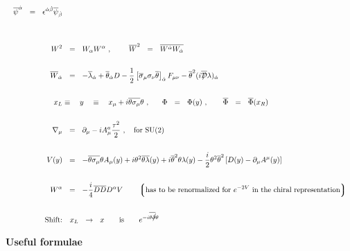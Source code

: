 \documentclass[14pt]{article}
\newcommand{\mc}[1]{\mathcal{#1}}
\newcommand{\ov}{\overline}
\newcommand{\lgr}{\left\lgroup}
\newcommand{\rgr}{\right\rgroup}
\def\slashed#1{\setbox0=\hbox{$#1$}             %
   \dimen0=\wd0                                 %
   \setbox1=\hbox{/} \dimen1=\wd1               %
   \ifdim\dimen0>\dimen1                        %
      \rlap{\hbox to \dimen0{\hfil/\hfil}}      %
      #1                                        %
   \else                                        %
      \rlap{\hbox to \dimen1{\hfil$#1$\hfil}}   %
      /                                         %
   \fi}                                         %
\begin{document}
\begin{align*}
\quad
	    \overline{\psi}^{\dot{\alpha}} ~~=~~ 
			  \epsilon^{\dot{\alpha}\dot{\beta}}
			  \overline{\psi}_{\dot{\beta}}\\ \\
 \\
  W^2 & ~~=~~  W_\alpha W^\alpha~,~~~~~~~ 
    \overline{W}^2 ~~=~~ \overline{W^{\dot{\alpha}} W_{\dot{\alpha}}} \\ \\
  \overline{W}_{\dot{\alpha}} & ~~=~~ 
        - \overline{\lambda}_{\dot{\alpha}} +
	  \overline{\theta}_{\dot{\alpha}} D -
	  \frac{1}{2} \left [ 
	      \overline{\sigma}_\mu\sigma_\nu \overline{\theta}
	              \right ]_{\dot{\alpha}} F_{\mu\nu} -
	  \overline{\theta}^2 (i \ov{\slashed{\mc{D}}}\lambda)_{\dot{\alpha}} \\ \\
  x_L & \equiv  ~~~y ~~~ 
	\equiv ~~~ x_\mu + i \overline{\theta\sigma_\mu}\theta~,~~~~~
   \Phi ~~=~~ \Phi(y)~,~~~~~~\overline{\Phi} ~~=~~ \overline{\Phi}(x_R) \\ \\
  \nabla_\mu & ~~=~~  \partial_\mu - i A_\mu^a \frac{\tau^2}{2}~,~~~ 
           \text{for SU(2)} \\ \\
  V(y) & ~~=~~  - \overline{\theta\sigma_\mu}\theta A_\mu(y) + 
	    i \theta^2 \overline{\theta\lambda}(y) +
            i \overline{\theta}^2 \theta\lambda(y) -
            \frac{i}{2}\theta^2\overline{\theta}^2
	    \left [ D(y) - \partial_\mu A^\mu(y) \right ] \\ \\
  W^\alpha & ~~=~~ - \frac{i}{4} \overline{DD} D^\alpha V 
  \qquad
  \lgr \text{has to be renormalized for $ e^{-2V} $ in the chiral representation} \rgr
	\\ \\
  \text{Shift:} &\quad x_L ~~\to~~ x  \qquad {\rm is} \qquad e^{-i \ov{\theta\slashed{\partial}}\theta}
\end{align*}


\pagebreak
\renewcommand{\arraystretch}{2.5}

\begin{center}
        {\Large\bf Useful formulae}
\end{center}
\end{document}
